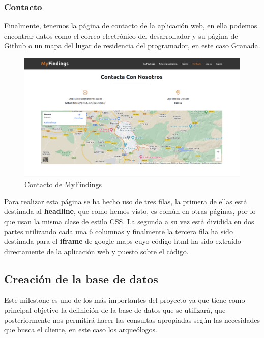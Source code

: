     \subsubsection{Contacto}
    Finalmente, tenemos la página de contacto de la aplicación web, en ella podemos
    encontrar datos como el correo electrónico del desarrollador y su página de
    \href{https://github.com/alexespana/}{Github} o un mapa del lugar de residencia del
    programador, en este caso Granada.\\

        \begin{figure}[H]
            \centering
            \includegraphics[scale=0.20]{imagenes/contact.png}
            \caption{Contacto de MyFindings}
            \label{fig:contact}
        \end{figure}

    Para realizar esta página se ha hecho uso de tres filas, la primera de ellas
    está destinada al \textbf{headline}, que como hemos visto, es común en otras páginas, 
    por lo que usan la misma clase de estilo CSS. La segunda a su vez está dividida en 
    dos partes utilizando cada una 6 columnas y finalmente la tercera fila ha sido
    destinada para el \textbf{iframe} de google maps cuyo código html ha sido extraído
    directamente de la aplicación web y puesto sobre el código.

\subsection{Creación de la base de datos}
Este milestone es uno de los más importantes del proyecto ya que tiene como principal objetivo
la definición de la base de datos que se utilizará, que posteriormente nos permitirá hacer las
consultas apropiadas según las necesidades que busca el cliente, en este caso los arqueólogos.\\

